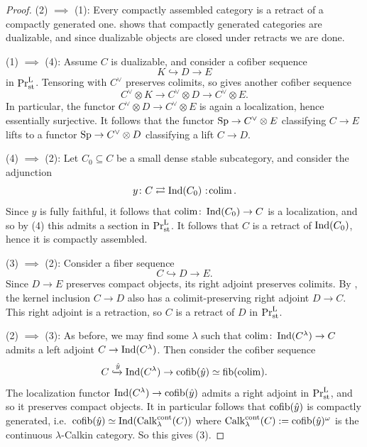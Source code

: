 	\begin{proof}
		(2) $\implies$ (1): Every compactly assembled category is a retract of a compactly generated one.  shows that compactly generated categories are dualizable, and since dualizable objects are closed under retracts we are done.

		(1) $\implies$ (4): Assume $C$ is dualizable, and consider a cofiber sequence
		\[
			K \hookrightarrow D \to E
		\]
		in $\textup{Pr}^{\textup{L}}_{\operatorname{st}}$. Tensoring with $C^{\vee}$ preserves colimits, so gives another cofiber sequence
		\[
			C^{\vee} \otimes K \to C^{\vee} \otimes D \to C^{\vee} \otimes E.
		\]
		In particular, the functor $C^{\vee} \otimes D \to C^{\vee} \otimes E$ is again a localization, hence essentially surjective. It follows that the functor ${\textup{Sp}} \to C^{\vee} \otimes E$ classifying $C \to E$ lifts to a functor ${\textup{Sp}} \to C^{\vee} \otimes D$ classifying a lift $C \to D$.

		(4) $\implies$ (2): Let $C_0 \subseteq C$ be a small dense stable subcategory, and consider the adjunction
		\[
			y\colon C \rightleftarrows \Ind(C_0) \noloc \colim.
		\]
		Since $y$ is fully faithful, it follows that $\operatorname{colim}\colon \operatorname{Ind}(C_0) \to C$ is a localization, and so by (4) this admits a section in $\textup{Pr}^{\textup{L}}_{\operatorname{st}}$. It follows that $C$ is a retract of $\operatorname{Ind}(C_0)$, hence it is compactly assembled.

		(3) $\implies$ (2): Consider a fiber sequence
		\[
			C \hookrightarrow D \to E.
		\]
		Since $D \to E$ preserves compact objects, its right adjoint preserves colimits. By , the kernel inclusion $C \to D$ also has a colimit-preserving right adjoint $D \to C$. This right adjoint is a retraction, so $C$ is a retract of $D$ in $\textup{Pr}^{\textup{L}}_{\operatorname{st}}$.

		(2) $\implies$ (3): As before, we may find some $\lambda$ such that $\operatorname{colim}\colon \operatorname{Ind}(C^{\lambda}) \to C$ admits a left adjoint $C \to \operatorname{Ind}(C^{\lambda})$. Then consider the cofiber sequence
		\[
			C \xhookrightarrow{\hat{y}} \operatorname{Ind}(C^{\lambda}) \to \operatorname{cofib}(\hat{y}) \simeq \operatorname{fib}(\operatorname{colim}).
		\]
		The localization functor $\operatorname{Ind}(C^{\lambda}) \to \operatorname{cofib}(\hat{y})$ admits a right adjoint in $\textup{Pr}^{\textup{L}}_{\operatorname{st}}$, and so it preserves compact objects. It in particular follows that $\operatorname{cofib}(\hat{y})$ is compactly generated, i.e.\ $\operatorname{cofib}(\hat{y}) \simeq \operatorname{Ind}(\operatorname{Calk}^{\operatorname{cont}}_{\lambda}(C))$ where $\operatorname{Calk}^{\operatorname{cont}}_{\lambda}(C) := \operatorname{cofib}(\hat{y})^{\omega}$ is the continuous $\lambda$-Calkin category. So this gives (3).
	\end{proof}

